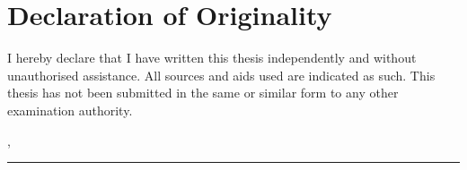 \section*{Declaration of Originality}
I hereby declare that I have written this thesis independently and without unauthorised assistance. 
All sources and aids used are indicated as such. 
This thesis has not been submitted in the same or similar form to any other examination authority.

\vspace{2.5cm}

\noindent\ThesisLocation, \ThesisSubmissionDate\\[1.2cm]
\noindent\rule{6cm}{0.4pt}\\
\ThesisAuthor
